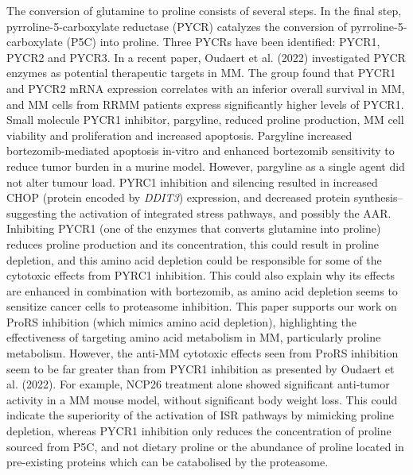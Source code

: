 The conversion of glutamine to proline consists of several steps.
In the final step, pyrroline-5-carboxylate reductase (PYCR) catalyzes the conversion of pyrroline-5-carboxylate (P5C) into proline.
Three PYCRs have been identified: PYCR1, PYCR2 and PYCR3.
In a recent paper, Oudaert et al. (2022) investigated PYCR enzymes as potential therapeutic targets in MM\cite{oudaert2022pyrroline}.
The group found that PYCR1 and PYCR2 mRNA expression correlates with an inferior overall survival in MM, and MM cells from RRMM patients express significantly higher levels of PYCR1\@.
Small molecule PYCR1 inhibitor, pargyline, reduced proline production, MM cell viability and proliferation and increased apoptosis.
Pargyline increased bortezomib-mediated apoptosis in-vitro and enhanced bortezomib sensitivity to reduce tumor burden in a murine model.
However, pargyline as a single agent did not alter tumour load.
PYRC1 inhibition and silencing resulted in increased CHOP (protein encoded by \textit{DDIT3}) expression, and decreased protein synthesis-- suggesting the activation of integrated stress pathways, and possibly the AAR.
Inhibiting PYCR1 (one of the enzymes that converts glutamine into proline) reduces proline production and its concentration, this could result in proline depletion, and this amino acid depletion could be responsible for some of the cytotoxic effects from PYRC1 inhibition.
This could also explain why its effects are enhanced in combination with bortezomib, as amino acid depletion seems to sensitize cancer cells to proteasome inhibition\cite{mizrachy2010amino}.
This paper supports our work on ProRS inhibition (which mimics amino acid depletion), highlighting the effectiveness of targeting amino acid metabolism in MM, particularly proline metabolism.
However, the anti-MM cytotoxic effects seen from ProRS inhibition seem to be far greater than from PYCR1 inhibition as presented by Oudaert et al. (2022).
For example, NCP26 treatment alone showed significant anti-tumor activity in a MM mouse model, without significant body weight loss\cite{bottpreclinical2022}.
This could indicate the superiority of the activation of ISR pathways by mimicking proline depletion, whereas PYCR1 inhibition only reduces the concentration of proline sourced from P5C, and not dietary proline or the abundance of proline located in pre-existing proteins which can be catabolised by the proteasome.

